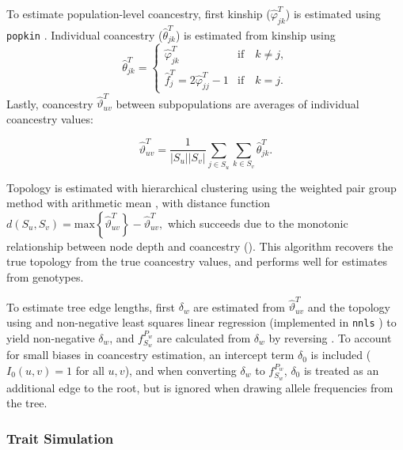 \documentclass[9pt,lineno]{elife}
\newcommand{\f}[2]{f^{#1}_{#2}}
\newcommand{\ktHat}[1][k]{\hat{\varphi}_{j#1}^T}
\newcommand{\ftHat}[1][j]{\hat{f}_{#1}^T}
\begin{document}
To estimate population-level coancestry, first kinship ($\ktHat$) is estimated using \texttt{popkin} \citep{ochoa_estimating_2021}.
Individual coancestry ($\hat{\theta}_{jk}^T$) is estimated from kinship using
\begin{equation}
  \label{eq:kinship_to_coanc}
  \hat{\theta}_{jk}^T
  =
  \begin{cases}
    \ktHat & \text{if} \quad k \ne j, \\
    \ftHat = 2 \ktHat[j] - 1 & \text{if} \quad k = j.
  \end{cases}
\end{equation}
Lastly, coancestry $\hat{\vartheta}_{uv}^T$ between subpopulations are averages of individual coancestry values:
\begin{linenomath*}
  $$
  \hat{\vartheta}_{uv}^T
  =
  \frac{1}{|S_u||S_v|} \sum_{j \in S_u} \sum_{k \in S_v} \hat{\theta}_{jk}^T
  .
  $$
\end{linenomath*}

Topology is estimated with hierarchical clustering using the weighted pair group method with arithmetic mean \citep{sokal_statistical_1958}, with distance function
$
d( S_u, S_v ) = \text{max} \left\{ \hat{\vartheta}_{uv}^T \right\} - \hat{\vartheta}_{uv}^T,
$
which succeeds due to the monotonic relationship between node depth and coancestry ().
This algorithm recovers the true topology from the true coancestry values, and performs well for estimates from genotypes.

To estimate tree edge lengths, first $\delta_w$ are estimated from $\hat{\vartheta}_{uv}^T$ and the topology using  and non-negative least squares linear regression \citep{lawson_solving_1974} (implemented in \texttt{nnls} \citep{mullen_nnls_2012}) to yield non-negative $\delta_w$, and $\f{P_w}{S_w}$ are calculated from $\delta_w$ by reversing .
To account for small biases in coancestry estimation, an intercept term $\delta_0$ is included ($I_0(u,v) = 1$ for all $u,v$), and when converting $\delta_w$ to $\f{P_w}{S_w}$, $\delta_0$ is treated as an additional edge to the root, but is ignored when drawing allele frequencies from the tree.


\subsubsection{Trait Simulation}

\label{sec:trait_sim}
\end{document}
